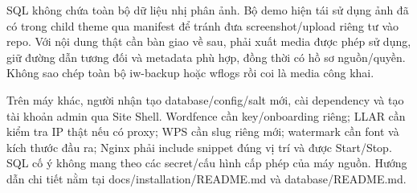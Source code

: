 SQL không chứa toàn bộ dữ liệu nhị phân ảnh. Bộ demo hiện tái sử dụng ảnh đã có trong child theme qua manifest để tránh đưa screenshot/upload riêng tư vào repo. Với nội dung thật cần bàn giao về sau, phải xuất media được phép sử dụng, giữ đường dẫn tương đối và metadata phù hợp, đồng thời có hồ sơ nguồn/quyền. Không sao chép toàn bộ iw-backup hoặc wflogs rồi coi là media công khai.

Trên máy khác, người nhận tạo database/config/salt mới, cài dependency và tạo tài khoản admin qua Site Shell. Wordfence cần key/onboarding riêng; LLAR cần kiểm tra IP thật nếu có proxy; WPS cần slug riêng mới; watermark cần font và kích thước đầu ra; Nginx phải include snippet đúng vị trí và được Start/Stop. SQL cố ý không mang theo các secret/cấu hình cấp phép của máy nguồn. Hướng dẫn chi tiết nằm tại docs/installation/README.md và database/README.md.

